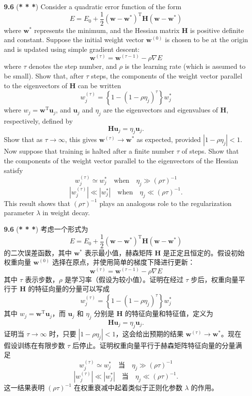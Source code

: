 \documentclass{article}
\begin{document}
\textbf{9.6} (\textbf{* * *}) Consider a quadratic error function of the form
\[
E = E_0 + \frac{1}{2} (\mathbf{w} - \mathbf{w}^*)^\mathrm{T} \mathbf{H} (\mathbf{w} - \mathbf{w}^*)
\]
where $\mathbf{w}^*$ represents the minimum, and the Hessian matrix $\mathbf{H}$ is positive definite and constant. Suppose the initial weight vector $\mathbf{w}^{(0)}$ is chosen to be at the origin and is updated using simple gradient descent:
\[
\mathbf{w}^{(\tau)} = \mathbf{w}^{(\tau-1)} - \rho \nabla E
\]
where $\tau$ denotes the step number, and $\rho$ is the learning rate (which is assumed to be small). Show that, after $\tau$ steps, the components of the weight vector parallel to the eigenvectors of $\mathbf{H}$ can be written
\[
w_j^{(\tau)} = \left\{ 1 - (1 - \rho \eta_j)^\tau \right\} w_j^*
\]
where $w_j = \mathbf{w}^\mathrm{T} \mathbf{u}_j$, and $\mathbf{u}_j$ and $\eta_j$ are the eigenvectors and eigenvalues of $\mathbf{H}$, respectively, defined by
\[
\mathbf{H} \mathbf{u}_j = \eta_j \mathbf{u}_j.
\]
Show that as $\tau \to \infty$, this gives $\mathbf{w}^{(\tau)} \to \mathbf{w}^*$ as expected, provided $|1 - \rho \eta_j| < 1$. Now suppose that training is halted after a finite number $\tau$ of steps. Show that the components of the weight vector parallel to the eigenvectors of the Hessian satisfy
\[
w_j^{(\tau)} \simeq w_j^* \quad \text{when} \quad \eta_j \gg (\rho \tau)^{-1}
\]
\[
|w_j^{(\tau)}| \ll |w_j^*| \quad \text{when} \quad \eta_j \ll (\rho \tau)^{-1}.
\]
This result shows that $(\rho \tau)^{-1}$ plays an analogous role to the regularization parameter $\lambda$ in weight decay.

\textbf{9.6} (\textbf{* * *}) 考虑一个形式为
\[
E = E_0 + \frac{1}{2} (\mathbf{w} - \mathbf{w}^*)^\mathrm{T} \mathbf{H} (\mathbf{w} - \mathbf{w}^*)
\]
的二次误差函数，其中 $\mathbf{w}^*$ 表示最小值，赫森矩阵 $\mathbf{H}$ 是正定且恒定的。假设初始权重向量 $\mathbf{w}^{(0)}$ 选择在原点，并使用简单的梯度下降进行更新：
\[
\mathbf{w}^{(\tau)} = \mathbf{w}^{(\tau-1)} - \rho \nabla E
\]
其中 $\tau$ 表示步数，$\rho$ 是学习率（假设为较小值）。证明在经过 $\tau$ 步后，权重向量平行于 $\mathbf{H}$ 的特征向量的分量可以写成
\[
w_j^{(\tau)} = \left\{ 1 - (1 - \rho \eta_j)^\tau \right\} w_j^*
\]
其中 $w_j = \mathbf{w}^\mathrm{T} \mathbf{u}_j$，而 $\mathbf{u}_j$ 和 $\eta_j$ 分别是 $\mathbf{H}$ 的特征向量和特征值，定义为
\[
\mathbf{H} \mathbf{u}_j = \eta_j \mathbf{u}_j.
\]
证明当 $\tau \to \infty$ 时，只要 $|1 - \rho \eta_j| < 1$，这会给出预期的结果 $\mathbf{w}^{(\tau)} \to \mathbf{w}^*$。现在假设训练在有限步数 $\tau$ 后停止。证明权重向量平行于赫森矩阵特征向量的分量满足
\[
w_j^{(\tau)} \simeq w_j^* \quad \text{当} \quad \eta_j \gg (\rho \tau)^{-1}
\]
\[
|w_j^{(\tau)}| \ll |w_j^*| \quad \text{当} \quad \eta_j \ll (\rho \tau)^{-1}.
\]
这一结果表明 $(\rho \tau)^{-1}$ 在权重衰减中起着类似于正则化参数 $\lambda$ 的作用。
\end{document}
